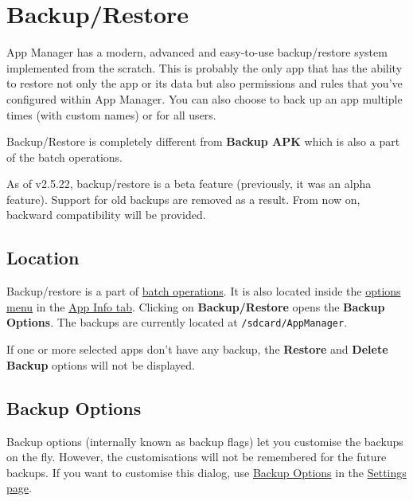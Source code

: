 \section{Backup/Restore}\label{sec:backup-restore}
App Manager has a modern, advanced and easy-to-use backup/restore system implemented from the scratch. This is probably
the only app that has the ability to restore not only the app or its data but also permissions and rules that you've
configured within App Manager. You can also choose to back up an app multiple times (with custom names) or for all users.

\begin{tip}[Notice]
    Backup/Restore is completely different from \textbf{Backup APK} which is also a part of the batch operations.
\end{tip}

\begin{warning}[Warning]
    As of v2.5.22, backup/restore is a beta feature (previously, it was an alpha feature). Support for old backups are
    removed as a result. From now on, backward compatibility will be provided.
\end{warning}

\subsection{Location}\label{subsec:backup-location}
Backup/restore is a part of \hyperref[subsec:batch-operations]{batch operations}. It is also located inside the
\hyperref[subsubsec:app-info-options-menu]{options menu} in the \hyperref[subsec:app-info-tab]{App Info tab}. Clicking
on \textbf{Backup/Restore} opens the \textbf{Backup Options}. The backups are currently located at
\texttt{/sdcard/AppManager}.

\begin{tip}[Note]
    If one or more selected apps don't have any backup, the \textbf{Restore} and \textbf{Delete Backup} options will not
    be displayed.
\end{tip}

\subsection{Backup Options}\label{subsec:backup-restore-backup-options}
Backup options (internally known as backup flags) let you customise the backups on the fly. However, the customisations
will not be remembered for the future backups. If you want to customise this dialog, use
\hyperref[subsubsec:settings-backup-options]{Backup Options} in the \hyperref[sec:settings-page]{Settings page}.

